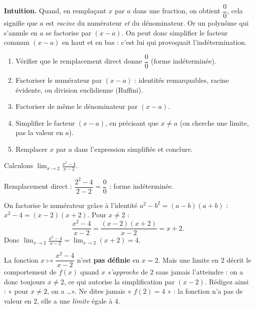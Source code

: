 \documentclass[11pt]{article}
\begin{document}
\textbf{Intuition.} Quand, en remplaçant $x$ par $a$ dans une fraction, on obtient $\dfrac{0}{0}$, cela signifie que $a$ est \emph{racine} du numérateur \emph{et} du dénominateur. Or un polynôme qui s'annule en $a$ se factorise par $(x - a)$. On peut donc simplifier le facteur commun $(x-a)$ en haut et en bas : c'est lui qui provoquait l'indétermination.

\begin{methode}[Lever $\dfrac{0}{0}$ en $x = a$ sur une fraction rationnelle]
\begin{enumerate}
\item Vérifier que le remplacement direct donne $\dfrac{0}{0}$ (forme indéterminée).
\item Factoriser le numérateur par $(x-a)$ : identités remarquables, racine évidente, ou division euclidienne (Ruffini).
\item Factoriser de même le dénominateur par $(x-a)$.
\item Simplifier le facteur $(x-a)$, en précisant que $x \neq a$ (on cherche une limite, pas la valeur en $a$).
\item Remplacer $x$ par $a$ dans l'expression simplifiée et conclure.
\end{enumerate}
\end{methode}

\begin{exemplebox}
Calculons $\displaystyle\lim_{x \to 2} \frac{x^2 - 4}{x - 2}$.

Remplacement direct : $\dfrac{2^2 - 4}{2 - 2} = \dfrac{0}{0}$ : forme indéterminée.

On factorise le numérateur grâce à l'identité $a^2 - b^2 = (a-b)(a+b)$ : $x^2 - 4 = (x-2)(x+2)$. Pour $x \neq 2$ :
\[ \frac{x^2 - 4}{x - 2} = \frac{(x-2)(x+2)}{x-2} = x + 2. \]
Donc $\displaystyle\lim_{x \to 2} \frac{x^2 - 4}{x - 2} = \lim_{x \to 2} (x+2) = 4$.
\end{exemplebox}

\begin{attention}
La fonction $x \mapsto \dfrac{x^2-4}{x-2}$ n'est \textbf{pas définie} en $x = 2$. Mais une limite en $2$ décrit le comportement de $f(x)$ quand $x$ \emph{s'approche} de $2$ sans jamais l'atteindre : on a donc toujours $x \neq 2$, ce qui autorise la simplification par $(x-2)$. Rédigez ainsi : « pour $x \neq 2$, on a \dots ». Ne dites jamais « $f(2) = 4$ » : la fonction n'a pas de valeur en $2$, elle a une \emph{limite} égale à $4$.
\end{attention}
\end{document}
